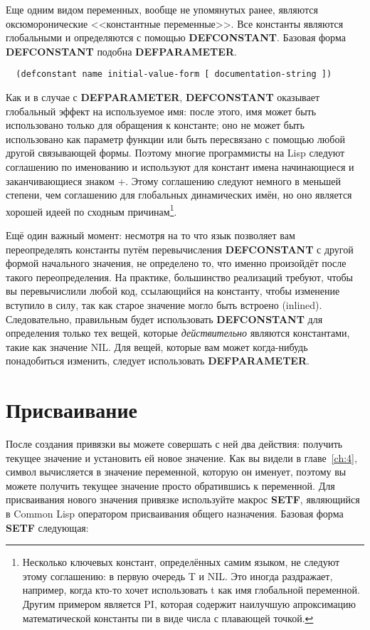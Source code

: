 Еще одним видом переменных, вообще не упомянутых ранее, являются оксюморонические
<<константные переменные>>. Все константы являются глобальными и определяются с помощью
\textbf{DEFCONSTANT}. Базовая форма \textbf{DEFCONSTANT} подобна \textbf{DEFPARAMETER}.

\begin{lstlisting}
  (defconstant name initial-value-form [ documentation-string ])
\end{lstlisting}

Как и в случае с \textbf{DEFPARAMETER}, \textbf{DEFCONSTANT} оказывает глобальный эффект
на используемое имя: после этого, имя может быть использовано только для обращения к
константе; оно не может быть использовано как параметр функции или быть пересвязано с
помощью любой другой связывающей формы. Поэтому многие программисты на Lisp следуют
соглашению по именованию и используют для констант имена начинающиеся и заканчивающиеся
знаком +. Этому соглашению следуют немного в меньшей степени, чем соглашению для
глобальных динамических имён, но оно является хорошей идеей по сходным
причинам\footnote{Несколько ключевых констант, определённых самим языком, не следуют этому
  соглашению: в первую очередь T и NIL. Это иногда раздражает, например, когда кто-то
  хочет использовать t как имя глобальной переменной. Другим примером является PI, которая
  содержит наилучшую апроксимацию математической константы пи в виде числа с плавающей
  точкой.}.

Ещё один важный момент: несмотря на то что язык позволяет вам переопределять константы
путём перевычисления \textbf{DEFCONSTANT} с другой формой начального значения, не
определено то, что именно произойдёт после такого переопределения. На практике,
большинство реализаций требуют, чтобы вы перевычислили любой код, ссылающийся на
константу, чтобы изменение вступило в силу, так как старое значение могло быть встроено
(inlined). Следовательно, правильным будет использовать \textbf{DEFCONSTANT} для
определения только тех вещей, которые \textit{действительно} являются константами, такие
как значение NIL. Для вещей, которые вам может когда-нибудь понадобиться изменить, следует
использовать \textbf{DEFPARAMETER}.

\section{Присваивание}

После создания привязки вы можете совершать с ней два действия: получить текущее значение
и установить ей новое значение. Как вы видели в главе~\ref{ch:4}, символ вычисляется в
значение переменной, которую он именует, поэтому вы можете получить текущее значение
просто обратившись к переменной. Для присваивания нового значения привязке используйте
макрос \textbf{SETF}, являющийся в Common Lisp оператором присваивания общего назначения.
Базовая форма \textbf{SETF} следующая:

